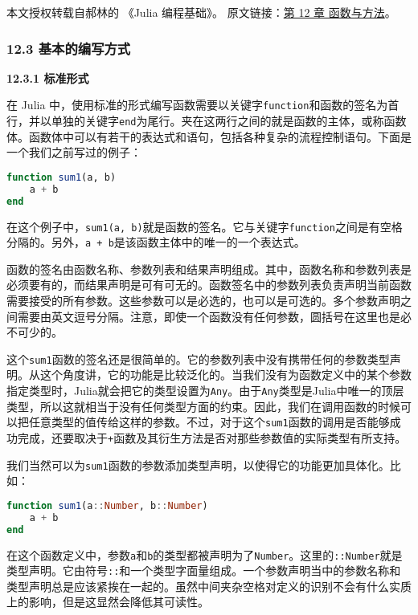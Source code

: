 
本文授权转载自郝林的 《Julia 编程基础》。 原文链接：\href{https://github.com/hyper0x/JuliaBasics/blob/master/book/ch12.md}{第 12 章 函数与方法}。

\subsubsection{12.3 基本的编写方式}

\textbf{12.3.1 标准形式}

在 Julia 中，使用标准的形式编写函数需要以关键字\verb|function|和函数的签名为首行，并以单独的关键字\verb|end|为尾行。夹在这两行之间的就是函数的主体，或称函数体。函数体中可以有若干的表达式和语句，包括各种复杂的流程控制语句。下面是一个我们之前写过的例子：

\begin{lstlisting}[language=julia]
function sum1(a, b)
    a + b
end
\end{lstlisting}

在这个例子中，\verb|sum1(a, b)|就是函数的签名。它与关键字\verb|function|之间是有空格分隔的。另外，\verb|a + b|是该函数主体中的唯一的一个表达式。

函数的签名由函数名称、参数列表和结果声明组成。其中，函数名称和参数列表是必须要有的，而结果声明是可有可无的。函数签名中的参数列表负责声明当前函数需要接受的所有参数。这些参数可以是必选的，也可以是可选的。多个参数声明之间需要由英文逗号分隔。注意，即使一个函数没有任何参数，圆括号在这里也是必不可少的。

这个\verb|sum1|函数的签名还是很简单的。它的参数列表中没有携带任何的参数类型声明。从这个角度讲，它的功能是比较泛化的。当我们没有为函数定义中的某个参数指定类型时，Julia就会把它的类型设置为\verb|Any|。由于\verb|Any|类型是Julia中唯一的顶层类型，所以这就相当于没有任何类型方面的约束。因此，我们在调用函数的时候可以把任意类型的值传给这样的参数。不过，对于这个\verb|sum1|函数的调用是否能够成功完成，还要取决于\verb|+|函数及其衍生方法是否对那些参数值的实际类型有所支持。

我们当然可以为\verb|sum1|函数的参数添加类型声明，以使得它的功能更加具体化。比如：

\begin{lstlisting}[language=julia]
function sum1(a::Number, b::Number)
    a + b
end
\end{lstlisting}

在这个函数定义中，参数\verb|a|和\verb|b|的类型都被声明为了\verb|Number|。这里的\verb|::Number|就是类型声明。它由符号\verb|::|和一个类型字面量组成。一个参数声明当中的参数名称和类型声明总是应该紧挨在一起的。虽然中间夹杂空格对定义的识别不会有什么实质上的影响，但是这显然会降低其可读性。

